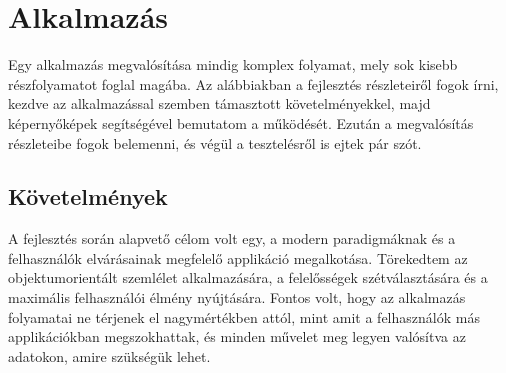 \chapter{Alkalmazás}

Egy alkalmazás megvalósítása mindig komplex folyamat, mely sok kisebb részfolyamatot foglal magába. Az alábbiakban a fejlesztés részleteiről fogok írni, kezdve az alkalmazással szemben támasztott követelményekkel, majd képernyőképek segítségével bemutatom a működését. Ezután a megvalósítás részleteibe fogok belemenni, és végül a tesztelésről is ejtek pár szót.

\section{Követelmények}

A fejlesztés során alapvető célom volt egy, a modern paradigmáknak és a felhasználók elvárásainak megfelelő applikáció megalkotása. Törekedtem az objektumorientált szemlélet alkalmazására, a felelősségek szétválasztására és a maximális felhasználói élmény nyújtására. Fontos volt, hogy az alkalmazás folyamatai ne térjenek el nagymértékben attól, mint amit a felhasználók más applikációkban megszokhattak, és minden művelet meg legyen valósítva az adatokon, amire szükségük lehet. 

